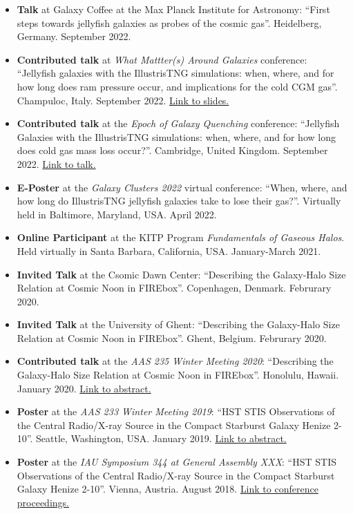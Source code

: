 \documentclass[a4paper,10pt,oneside]{article}
\begin{document}
\begin{itemize}[wide, labelwidth=!, labelindent=-11pt, parsep=0pt]
    \item {\bf Talk} at Galaxy Coffee at the Max Planck Institute for Astronomy: ``First steps towards jellyfish galaxies as probes of the cosmic gas''. Heidelberg, Germany. September 2022.
    \item {\bf Contributed talk} at {\it What Mattter(s) Around Galaxies} conference: ``Jellyfish galaxies with the IllustrisTNG simulations: when, where, and for how long does ram pressure occur, and implications for the cold CGM gas''. Champuloc, Italy. September 2022. \href{https://drive.google.com/file/u/0/d/1x4FNVCmUWTFwznOAs9RYhLwkKl-kmhZT/view?usp=drive_web}{Link to slides.}
    \item {\bf Contributed talk} at the {\it Epoch of Galaxy Quenching} conference: ``Jellyfish Galaxies with the IllustrisTNG simulations: when, where, and for how long does cold gas mass loss occur?''. Cambridge, United Kingdom. September 2022. \href{https://sites.google.com/cam.ac.uk/quenching/programme#h.ohkoyw4ilbje}{Link to talk.}
    \item {\bf E-Poster} at the {\it Galaxy Clusters 2022} virtual conference: ``When, where, and how long do IllustrisTNG jellyfish galaxies take to lose their gas?''. Virtually held in Baltimore, Maryland, USA. April 2022.
    \item {\bf Online Participant} at the KITP Program {\it Fundamentals of Gaseous Halos}. Held virtually in Santa Barbara, California, USA. January-March 2021. 
    \item {\bf Invited Talk} at the Csomic Dawn Center: ``Describing the Galaxy-Halo Size Relation at Cosmic Noon in FIREbox''. Copenhagen, Denmark. Februrary 2020. 
    \item {\bf Invited Talk} at the University of Ghent: ``Describing the Galaxy-Halo Size Relation at Cosmic Noon in FIREbox''. Ghent, Belgium. Februrary 2020. 
    \item {\bf Contributed talk} at the {\it AAS 235 Winter Meeting 2020}: ``Describing the Galaxy-Halo Size Relation at Cosmic Noon in FIREbox''. Honolulu, Hawaii. January 2020. \href{https://ui.adsabs.harvard.edu/abs/2020AAS...23526001R/abstract}{Link to abstract.}
    \item {\bf Poster} at the {\it AAS 233 Winter Meeting 2019}: ``HST STIS Observations of the Central Radio/X-ray Source in the Compact Starburst Galaxy Henize 2-10''. Seattle, Washington, USA. January 2019. \href{https://ui.adsabs.harvard.edu/abs/2019AAS...23335119R/abstract}{Link to abstract.}
    \item {\bf Poster} at the {\it IAU Symposium 344 at General Assembly XXX}: ``HST STIS Observations of the Central Radio/X-ray Source in the Compact Starburst Galaxy Henize 2-10''. Vienna, Austria. August 2018. \href{https://doi.org/10.1017/S1743921318006282}{Link to conference proceedings.}
\end{itemize}
\end{document}
